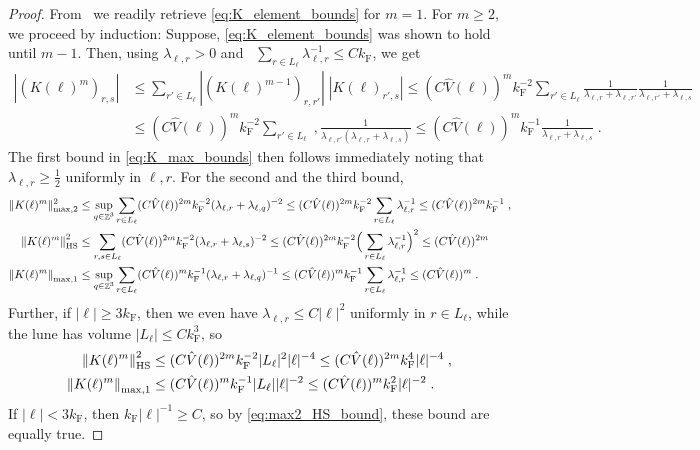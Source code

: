 \documentclass[12pt,a4paper]{article}
\numberwithin{equation}{section}
\newcommand{\1}{\mathbb{I}}
\newcommand{\F}{\mathrm{F}}
\newcommand{\HS}{\mathrm{HS}}
\DeclareMathOperator{\Z}{\mathbb{Z}}
\newcommand{\normmaxi}[1]{\norm{#1}_{\mathrm{max,1}}}
\theoremstyle{plain}
\theoremstyle{definition}
\theoremstyle{remark}
\theoremstyle{plain}
\theoremstyle{definition}
\theoremstyle{remark}
\begin{document}
\begin{proof}
From~\cite[Prop.~7.10]{CHN23} we readily retrieve \eqref{eq:K_element_bounds} for $ m = 1 $. For $ m \ge 2 $, we proceed by induction: Suppose, \eqref{eq:K_element_bounds} was shown to hold until $ m-1 $. Then, using $ \lambda_{\ell,r} > 0 $ and~\cite[Prop.~A.2]{CHN21} $ \sum_{r \in L_\ell} \lambda_{\ell,r}^{-1} \le C k_{\F} $, we get
\begin{equation}
	\begin{aligned}
		|(K(\ell)^m)_{r,s}|
		&\le \sum_{r' \in L_\ell}
		|(K(\ell)^{m-1})_{r,r'}| \;
		|K(\ell)_{r',s}|
		\le (C \hat{V}(\ell))^m k_{\F}^{-2} \sum_{r' \in L_\ell}
		\frac{1}{\lambda_{\ell, r} + \lambda_{\ell, r'}}
		\frac{1}{\lambda_{\ell, r'} + \lambda_{\ell, s}} \\
		&\le (C \hat{V}(\ell))^m k_{\F}^{-2} \sum_{r' \in L_\ell} \;,
		\frac{1}{\lambda_{\ell, r'} (\lambda_{\ell, r} + \lambda_{\ell, s})}
		\le (C \hat{V}(\ell))^m k_{\F}^{-1}
		\frac{1}{\lambda_{\ell, r} + \lambda_{\ell, s}} \;.
	\end{aligned}
\end{equation}
The first bound in \eqref{eq:K_max_bounds} then follows immediately noting that $ \lambda_{\ell,r} \ge \frac 12 $ uniformly in $ \ell, r $. For the second and the third bound,
\begin{equation} \label{eq:max2_HS_bound}
\begin{aligned}
	\Vert K(\ell)^m \Vert_{\max,2}^2
	&\le \sup_{q \in \Z^3} \sum_{r \in L_\ell} (C \hat{V}(\ell))^{2m} k_{\F}^{-2} (\lambda_{\ell,r} + \lambda_{\ell,q})^{-2}
	\le (C \hat{V}(\ell))^{2m} k_{\F}^{-2} \sum_{r \in L_\ell} \lambda_{\ell,r}^{-1}
	\le (C \hat{V}(\ell))^{2m} k^{-1}_{\F} \;, \\
	\norm{K(\ell)^m}_{\HS}^2
	&\le \sum_{r,s \in L_\ell} (C \hat{V}(\ell))^{2m} k_{\F}^{-2} (\lambda_{\ell,r} + \lambda_{\ell,s})^{-2}
	\le (C \hat{V}(\ell))^{2m} k_{\F}^{-2} \Big( \sum_{r \in L_\ell}  \lambda_{\ell,r}^{-1} \Big)^2
	\le (C \hat{V}(\ell))^{2m} \; \\
	\normmaxi{K(\ell)^m} 
	&\leq \sup_{q \in \Z^3} \sum_{r \in L_\ell} (C \hat{V}(\ell))^{m} k_{\F}^{-1} (\lambda_{\ell,r} + \lambda_{\ell,q})^{-1} \le (C \hat{V}(\ell))^{m} k_{\F}^{-1} \sum_{r \in L_\ell} \lambda_{\ell,r}^{-1} \leq (C \hat{V}(\ell))^{m} \;.
\end{aligned}
\end{equation}
Further, if $ |\ell| \ge 3 k_{\F} $, then we even have $ \lambda_{\ell,r} \le C |\ell|^2 $ uniformly in $ r \in L_\ell $, while the lune has volume $ |L_\ell| \le C k_{\F}^3 $, so
\begin{align}
	\norm{K(\ell)^m}_{\HS}^2
	&\le (C \hat{V}(\ell))^{2m} k_{\F}^{-2} |L_\ell|^2 |\ell|^{-4}
	\le (C \hat{V}(\ell))^{2m} k_{\F}^4 |\ell|^{-4} \;,\\
	\norm{K(\ell)^m}_{\mathrm{max,1}}
	&\le (C \hat{V}(\ell))^{m} k_{\F}^{-1} |L_\ell| |\ell|^{-2}
	\le (C \hat{V}(\ell))^{m} k_{\F}^2 |\ell|^{-2} \;.
\end{align}
If $ |\ell| < 3 k_{\F} $, then $ k_{\F} |\ell|^{-1} \ge C $, so by \eqref{eq:max2_HS_bound}, these bound are equally true.
\end{proof}
\end{document}
